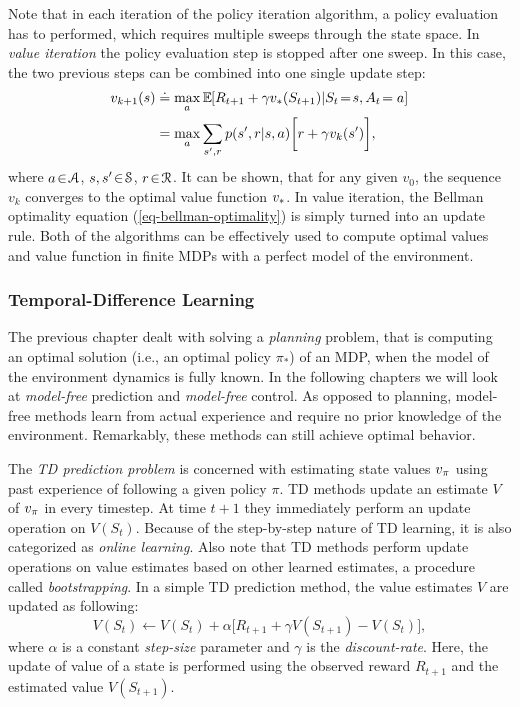 \documentclass[a4paper, twoside, 12pt]{article}
\begin{document}
Note that in each iteration of the policy iteration algorithm, a policy
evaluation has to performed, which requires multiple sweeps through the state
space. In \emph{value iteration} the policy evaluation step is stopped after one
sweep. In this case, the two previous steps can be combined into one single
update step:
\begin{equation}
\begin{split}
    v_{k+1}(s) &\defeq \max_a \EE{}{R_{t+1}+\gamma \vstar(S_{t+1})|S_t\!=\!s, A_t\!=a} \\
    &= \max_{a}\sum_{s',r}{p(s',r|s,a)}\bigg[r+\gamma v_k(s')\bigg],
\end{split}
\end{equation}
where \(a\!\in\!\A\), \(s,s'\!\in\!\S\), \(r\!\in\!\R\). It can be shown, that for any
given \(v_0\), the sequence \({v_k}\) converges to the optimal value function
\({\vstar}\). In value iteration, the Bellman optimality equation
(\ref{eq-bellman-optimality}) is simply turned into an update rule. Both of the
algorithms can be effectively used to compute optimal values and value function
in finite MDPs with a perfect model of the environment.
\subsubsection{Temporal-Difference Learning \label{sec-td-learning}}
\label{sec:org8028063}
The previous chapter dealt with solving a \emph{planning} problem, that is computing
an optimal solution (i.e., an optimal policy \(\pi_*\)) of an MDP, when the model
of the environment dynamics is fully known. In the following chapters we will
look at \emph{model-free} prediction and \emph{model-free} control. As opposed to
planning, model-free methods learn from actual experience and require no prior
knowledge of the environment. Remarkably, these methods can still achieve
optimal behavior.

The \emph{TD prediction problem} is concerned with estimating state values \(\vpi\)
using past experience of following a given policy \(\pi\). TD methods update an
estimate \(V\) of \(\vpi\) in every timestep. At time \(t\!+\!1\) they immediately
perform an update operation on \(V(S_t)\). Because of the step-by-step nature of
TD learning, it is also categorized as \emph{online learning}. Also note that TD
methods perform update operations on value estimates based on other learned
estimates, a procedure called \emph{bootstrapping}. In a simple TD prediction method,
the value estimates \(V\) are updated as following:
\begin{equation} \label{eq-td-prediction}
    V(S_t) \leftarrow V(S_t) + \alpha\big[R_{t+1}+\gamma V(S_{t+1}) - V(S_t)\big],
\end{equation}
where \(\alpha\) is a constant \emph{step-size} parameter and \(\gamma\) is the
\emph{discount-rate}. Here, the update of value of a state is performed using the
observed reward \(R_{t+1}\) and the estimated value \(V(S_{t+1})\).
\end{document}
